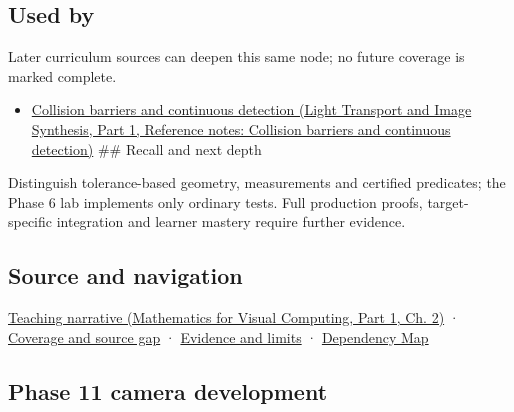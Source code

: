 \subsection{Used by}\label{appendix-341296fb3f64-used-by}

\hypertarget{appendix-341296fb3f64-used-by}{}

Later curriculum sources can deepen this same node; no future coverage is marked complete.

\begin{itemize}
\tightlist
\item
  \href{../04-Light-Transport-and-Image-Synthesis-P01/main.pdf\#appendix-a9ba01fa72a6}{Collision barriers and continuous detection (Light Transport and Image Synthesis, Part 1, Reference notes: Collision barriers and continuous detection)} \#\# Recall and next depth
\end{itemize}

Distinguish tolerance-based geometry, measurements and certified predicates; the Phase 6 lab implements only ordinary tests. Full production proofs, target-specific integration and learner mastery require further evidence.

\subsection{Source and navigation}\label{appendix-341296fb3f64-source-and-navigation}

\hypertarget{appendix-341296fb3f64-source-and-navigation}{}

\href{../02-Mathematics-for-Visual-Computing-P01/main.pdf\#01-foundations-i-ch018-the-sensor-needs-coordinates-inside-the-triangle}{Teaching narrative (Mathematics for Visual Computing, Part 1, Ch. 2)} · \hyperref[appendix-fd090d982a15-phase-6---parts-501-600]{Coverage and source gap} · \hyperref[appendix-a103e7846d21-phase-6---source-analysis-and-verification]{Evidence and limits} · \hyperref[appendix-4ad47bdd269a]{Dependency Map}

\subsection{Phase 11 camera development}\label{appendix-341296fb3f64-phase-11-camera-development}

\hypertarget{appendix-341296fb3f64-phase-11-camera-development}{}

